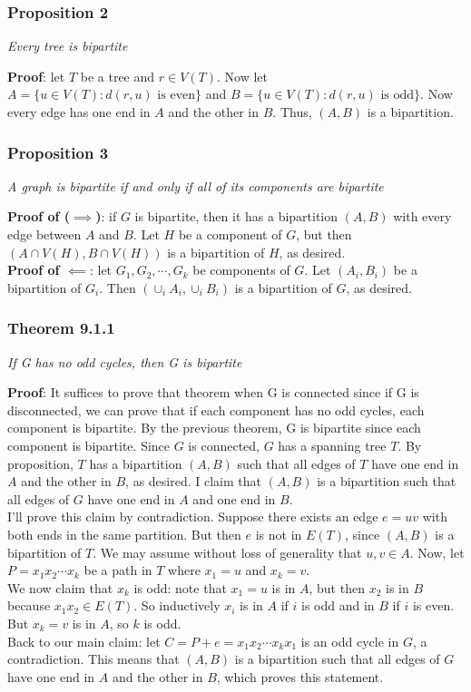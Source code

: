 \documentclass{report}
\begin{document}
\subsubsection{Proposition 2}
\begin{center}
\textit{Every tree is bipartite}
\end{center}
\textbf{Proof}: let $T$ be a tree and $r \in V(T)$. Now let $A = \{u \in V(T) : d(r,u) \,\,\mathrm{is \,\, even}\}$ and $B = \{u \in V(T) : d(r,u) \,\,\mathrm{is \,\, odd}\}$. Now every edge has one end in $A$ and the other in $B$. Thus, $(A, B)$ is a bipartition.
\subsubsection{Proposition 3}
\begin{center}
\textit{A graph is bipartite if and only if all of its components are bipartite}
\end{center}
\textbf{Proof of ($\implies$)}: if $G$ is bipartite, then it has a bipartition $(A, B)$ with every edge between $A$ and $B$. Let $H$ be a component of $G$, but then $(A\cap V(H), B \cap V(H))$ is a bipartition of $H$, as desired. \\
\textbf{Proof of $\impliedby$}: let $G_1, G_2, \cdots, G_k$ be components of $G$. Let $(A_i, B_i)$ be a bipartition of $G_i$. Then $(\cup_i A_i, \cup_{i} B_i)$ is a bipartition of $G$, as desired.
\subsubsection{Theorem 9.1.1}
\begin{center}
\textit{If G has no odd cycles, then G is bipartite}
\end{center}
\textbf{Proof}: It suffices to prove that theorem when G is connected since if G is disconnected, we can prove that if each component has no odd cycles, each component is bipartite. By the previous theorem, G is bipartite since each component is bipartite.
Since $G$ is connected, $G$ has a spanning tree $T$. By proposition, $T$ has a bipartition $(A, B)$ such that all edges of $T$ have one end in $A$ and the other in $B$, as desired. I claim that $(A, B)$ is a bipartition such that all edges of $G$ have one end in $A$ and one end in $B$.\\
I'll prove this claim by contradiction. Suppose there exists an edge $e = uv$ with both ends in the same partition. But then $e$ is not in $E(T)$, since $(A,B)$ is a bipartition of $T$. We may assume without loss of generality that $u,v \in A$. Now, let $P = x_1x_2 \cdots x_k$ be a path in $T$ where $x_1 = u$ and $x_k = v$. \\We now claim that $x_k$ is odd: note that $x_1 = u$ is in $A$, but then $x_2$ is in $B$ because $x_1x_2 \in E(T)$. So inductively $x_i$ is in $A$ if $i$ is odd and in $B$ if $i$ is even. But $x_k = v$ is in $A$, so $k$ is odd.\\
Back to our main claim: let $C = P + e = x_1x_2 \cdots x_kx_1$ is an odd cycle in $G$, a contradiction. This means that $(A,B)$ is a bipartition such that all edges of $G$ have one end in $A$ and the other in $B$, which proves this statement.

\end{document}
